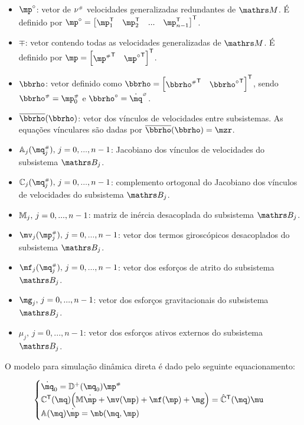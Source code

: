 \documentclass[a4paper,11pt,brazil,fleqn]{article}
\begin{document}
\begin{itemize}
\item $\mp\cir$: vetor de $\nu^{\scriptscriptstyle \#}$ velocidades generalizadas redundantes de $\ssM$. É definido por $\mp\cir = \begin{bmatrix} \mp_1^\msT & \mp_2^\msT & ... & \mp_{n-1}^\msT \end{bmatrix}^\msT $.
\item $\mp$: vetor contendo todas as velocidades generalizadas de $\ssM$. É definido por $\mp = \begin{bmatrix} {\mp\ssh}^\msT & {\mp\cir}^\msT \end{bmatrix}^\msT $.
\item $\mrho$: vetor definido como $\mrho = \begin{bmatrix} {\mrho\ssh}^\msT & {\mrho\cir}^\msT \end{bmatrix}^\msT $, sendo $\mrho\ssh = \mp_0\ssh$ e $\mrho\cir = \dot{\mq}\hcir $.
\item $\overline{\mrho}(\mrho)$: vetor dos v\'inculos de velocidades entre subsistemas. As equa\c{c}\~oes v\'inculares s\~ao dadas por $\overline{\mrho}(\mrho) = \mzr $.
\item $\mA_j(\mq_j\ssh), \,j=0, ..., n-1$: Jacobiano dos v\'inculos de velocidades do subsistema $\ssB_j$.
\item $\mC_j(\mq_j\ssh), \,j=0, ..., n-1$: complemento ortogonal do Jacobiano dos v\'inculos de velocidades do subsistema $\ssB_j$.
\item $\mathbb{M}_j, \,j=0, ..., n-1$: matriz de in\'ercia desacoplada do subsistema $\ssB_j$.
\item $\mv_j(\mp_j\ssh), \,j=0, ..., n-1 $: vetor dos termos girosc\'opicos desacoplados do subsistema $\ssB_j$.
\item $\mf_j(\mq_j\ssh), \,j=0, ..., n-1$: vetor dos esfor\c{c}os de atrito do subsistema $\ssB_j$.
\item $\mg_j, \,j=0, ..., n-1$: vetor dos esfor\c{c}os gravitacionais do subsistema $\ssB_j$.
\item $\mu_j, \,j=0, ..., n-1$: vetor dos esfor\c{c}os ativos externos do subsistema $\ssB_j$.
\end{itemize}

O modelo para simula\c{c}\~ao din\^amica direta \'e dado pelo seguinte equacionamento:

\begin{equation} \label{eq:DinamicaDireta2}
\begin{cases}
\dot{\mq}_0 = \mD^+ (\mq_0) \mp\ssh \\
\mC^\msT(\mq) \Big( \mM \dot{\mp} + \mv(\mp) + \mf(\mp) + \mg \Big) = \hat{\mC}^\msT(\mq) \mu \\
\mA(\mq) \dot{\mp} = \mb(\mq,\mp)
\end{cases}
\end{equation}
\end{document}
